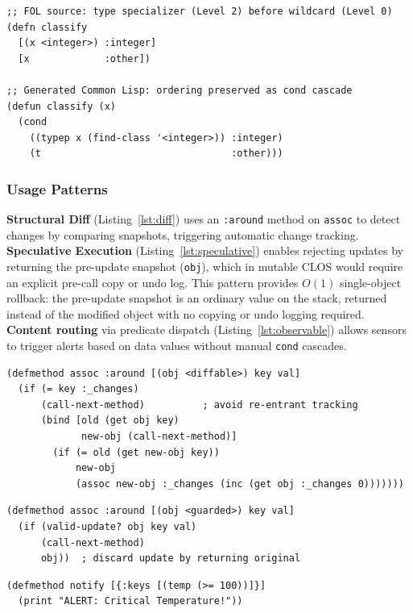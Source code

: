 \documentclass[sigconf,nonacm]{acmart}
\begin{document}
\begin{lstlisting}[caption={Transpilation: specificity-ordered multi-clause \texttt{defn}}, label={lst:transpile}]
;; FOL source: type specializer (Level 2) before wildcard (Level 0)
(defn classify
  [(x <integer>) :integer]
  [x             :other])

;; Generated Common Lisp: ordering preserved as cond cascade
(defun classify (x)
  (cond
    ((typep x (find-class '<integer>)) :integer)
    (t                                 :other)))
\end{lstlisting}

\subsubsection{Usage Patterns}
\textbf{Structural Diff} (Listing~\ref{lst:diff}) uses an \texttt{:around} method on \texttt{assoc} to detect changes by comparing snapshots, triggering automatic change tracking. \textbf{Speculative Execution} (Listing~\ref{lst:speculative}) enables rejecting updates by returning the pre-update snapshot (\texttt{obj}), which in mutable CLOS would require an explicit pre-call copy or undo log. This pattern provides $O(1)$ single-object rollback: the pre-update snapshot is an ordinary value on the stack, returned instead of the modified object with no copying or undo logging required. \textbf{Content routing} via predicate dispatch (Listing~\ref{lst:observable}) allows sensors to trigger alerts based on data values without manual \texttt{cond} cascades.

\begin{lstlisting}[caption={Automatic Structural Diff}, label={lst:diff}]
(defmethod assoc :around [(obj <diffable>) key val]
  (if (= key :_changes)
      (call-next-method)          ; avoid re-entrant tracking
      (bind [old (get obj key)
             new-obj (call-next-method)]
        (if (= old (get new-obj key))
            new-obj
            (assoc new-obj :_changes (inc (get obj :_changes 0)))))))
\end{lstlisting}

\begin{lstlisting}[caption={Speculative Execution Guard}, label={lst:speculative}]
(defmethod assoc :around [(obj <guarded>) key val]
  (if (valid-update? obj key val)
      (call-next-method)
      obj))  ; discard update by returning original
\end{lstlisting}

\begin{lstlisting}[caption={Value-Based Alerting}, label={lst:observable}]
(defmethod notify [{:keys [(temp (>= 100))]}]
  (print "ALERT: Critical Temperature!"))
\end{lstlisting}
\end{document}
